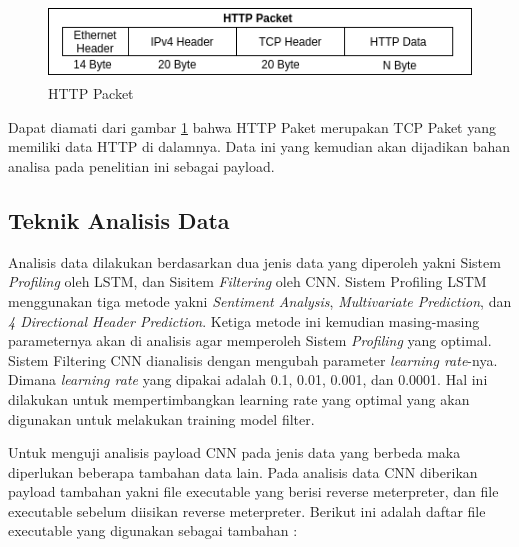 \documentclass[./skripsi.tex]{subfiles}
\begin{document}
\begin{figure}%
    \centering
    \includegraphics[height=2cm]{public/assets/img/HTTPPacket.png}
    \caption{HTTP Packet}
    \label{fig:httppaket}
\end{figure}
\par Dapat diamati dari gambar \ref{fig:httppaket} bahwa HTTP Paket merupakan TCP Paket yang memiliki data HTTP di dalamnya. Data ini yang kemudian akan dijadikan bahan analisa pada penelitian ini sebagai payload.
\subsection{Teknik Analisis Data}
\par Analisis data dilakukan berdasarkan dua jenis data yang diperoleh yakni Sistem \textit{Profiling} oleh LSTM, dan Sisitem \textit{Filtering} oleh CNN. Sistem Profiling LSTM menggunakan tiga metode yakni \textit{Sentiment Analysis}, \textit{Multivariate Prediction}, dan \textit{4 Directional Header Prediction}. Ketiga metode ini kemudian masing-masing parameternya akan di analisis agar memperoleh Sistem \textit{Profiling} yang optimal. Sistem Filtering CNN dianalisis dengan mengubah parameter \textit{learning rate}-nya. Dimana \textit{learning rate} yang dipakai adalah 0.1, 0.01, 0.001, dan 0.0001. Hal ini dilakukan untuk mempertimbangkan learning rate yang optimal yang akan digunakan untuk melakukan training model filter.
\par Untuk menguji analisis payload CNN pada jenis data yang berbeda maka diperlukan beberapa tambahan data lain. Pada analisis data CNN diberikan payload tambahan yakni file executable yang berisi reverse meterpreter, dan file executable sebelum diisikan reverse meterpreter. Berikut ini adalah daftar file executable yang digunakan sebagai tambahan :
\end{document}
